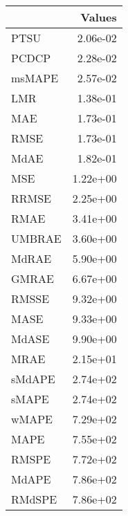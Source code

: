 \begin{tabular}{lr}
\toprule
 & Values \\
\midrule
PTSU & 2.06e-02 \\
PCDCP & 2.28e-02 \\
msMAPE & 2.57e-02 \\
LMR & 1.38e-01 \\
MAE & 1.73e-01 \\
RMSE & 1.73e-01 \\
MdAE & 1.82e-01 \\
MSE & 1.22e+00 \\
RRMSE & 2.25e+00 \\
RMAE & 3.41e+00 \\
UMBRAE & 3.60e+00 \\
MdRAE & 5.90e+00 \\
GMRAE & 6.67e+00 \\
RMSSE & 9.32e+00 \\
MASE & 9.33e+00 \\
MdASE & 9.90e+00 \\
MRAE & 2.15e+01 \\
sMdAPE & 2.74e+02 \\
sMAPE & 2.74e+02 \\
wMAPE & 7.29e+02 \\
MAPE & 7.55e+02 \\
RMSPE & 7.72e+02 \\
MdAPE & 7.86e+02 \\
RMdSPE & 7.86e+02 \\
\bottomrule
\end{tabular}
